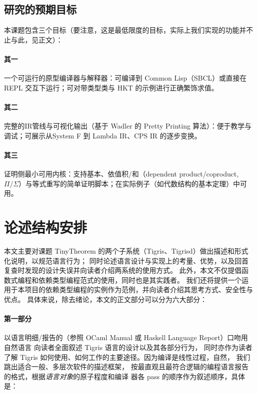 \subsection{研究的预期目标}
本课题包含三个目标（要注意，这是最低限度的目标，实际上我们实现的功能并不止与此，见正文）：
{\setlength{\parskip}{-1em}
  \paragraph{其一} 一个可运行的原型编译器与解释器：可编译到 Common Lisp（SBCL）或直接在 REPL 交互下运行；可对带类型类与 HKT 的示例进行正确繁饰求值。
  \paragraph{其二} 完整的IR管线与可视化输出（基于 Wadler 的 Pretty Printing 算法）：便于教学与调试；可展示从System F 到 Lambda IR、CPS IR 的逐步变换。
  \paragraph{其三} 证明侧最小可用内核：支持基本\lambdaterm、依值积/和（dependent product/coproduct, $\Pi/\Sigma$）与等式重写的简单证明脚本；在实际例子（如代数结构的基本定理）中可用。
}
\section{论述结构安排}\label{arrange}
本文主要对课题 TinyTheorem 的两个子系统（Tigris、Tigrisd）做出描述和形式化说明，以规范语言行为；
同时论述语言设计与实现上的考量、优势，以及回首复查时发现的设计失误并向读者介绍两系统的使用方式。
此外，本文不仅提倡函数式编程和依赖类型编程范式的使用，同时也是其实践者。
我们还将提供一个运用于本项目的依赖类型编程的实例作为范例，并向读者介绍其思考方式、安全性与优点。
具体来说，除去绪论，本文的正文部分可以分为六大部分：

\paragraph{第一部分}以语言明细/报告的（参照 OCaml Manual 或 Haskell Language Report）口吻用自然语言
向读者全面叙述 Tigris 语言的设计以及其各部分行为，
同时亦作为读者了解 Tigris 如何使用、如何工作的主要途径。因为编译是线性过程，自然，
我们跳出适合一般、多层次软件的描述框架，
按最直观且最符合逻辑的编程语言报告的格式，根据\emph{语言对象}的原子程度和编译
器各 pass 的顺序作为叙述顺序，具体是：

